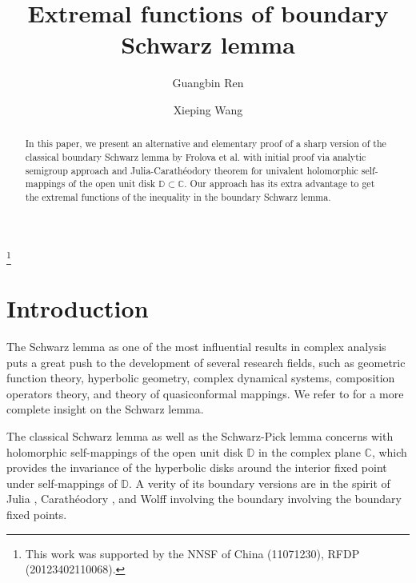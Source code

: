 \documentclass{amsart}
\theoremstyle{definition}
\theoremstyle{remark}
\numberwithin{equation}{section}
\begin{document}
\title{Extremal functions of boundary Schwarz lemma}

\author[G. B. Ren]{Guangbin Ren}

\thanks{This work was supported by the NNSF  of China (11071230), RFDP (20123402110068).}

\author[X. P. Wang]{Xieping Wang}
\address{Guangbin Ren, Department of Mathematics, University of Science and
Technology of China, Hefei 230026, China}
\address{Xieping Wang, Department of Mathematics, University of Science and
Technology of China, Hefei 230026, China}



\begin{abstract}
In this paper, we present an alternative and  elementary proof of a sharp version of the classical  boundary Schwarz lemma by Frolova et al. with initial proof via  analytic semigroup approach and   Julia-Carath\'{e}odory theorem  for univalent holomorphic self-mappings of the open unit disk $\mathbb D\subset \mathbb C$. Our approach has its extra advantage to get the extremal functions of the inequality in the boundary Schwarz lemma.


\end{abstract}
\maketitle



\section{Introduction}
The Schwarz lemma as one of the most influential  results in  complex analysis  puts a great push to the development of several research fields,   such as  geometric function theory, hyperbolic geometry,  complex dynamical systems,  composition operators theory, and theory of quasiconformal mappings. We refer to \cite{Abate, EJLS} for  a more complete insight on the Schwarz lemma.

The classical Schwarz lemma as well as  the Schwarz-Pick lemma concerns with  holomorphic self-mappings of the open unit disk $\mathbb D$ in the complex plane $\mathbb C$, which  provides the invariance of the hyperbolic disks around the interior fixed point under self-mappings of $\mathbb D$. A verity of its boundary versions are in the spirit of Julia \cite{Julia}, Carath\'{e}odory \cite{Caratheodory}, and  Wolff \cite{Wolff1, Wolff2} involving the boundary involving the boundary fixed points.
\end{document}
